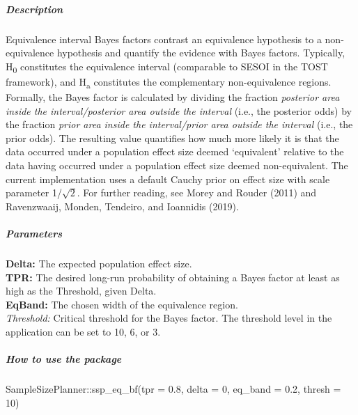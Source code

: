 \documentclass[
  english,
  man,floatsintext]{apa6}
\newenvironment{Shaded}{\begin{snugshade}}{\end{snugshade}}
\newcommand{\AttributeTok}[1]{\textcolor[rgb]{0.77,0.63,0.00}{#1}}
\newcommand{\DecValTok}[1]{\textcolor[rgb]{0.00,0.00,0.81}{#1}}
\newcommand{\FloatTok}[1]{\textcolor[rgb]{0.00,0.00,0.81}{#1}}
\newcommand{\FunctionTok}[1]{\textcolor[rgb]{0.00,0.00,0.00}{#1}}
\newcommand{\NormalTok}[1]{#1}
\newcommand{\SpecialCharTok}[1]{\textcolor[rgb]{0.00,0.00,0.00}{#1}}
\let\oldsubparagraph\subparagraph
\renewcommand{\subparagraph}[1]{\oldsubparagraph{#1}\mbox{}}
\begin{document}
\hypertarget{description-1}{%
\subparagraph{Description}\label{description-1}}

Equivalence interval Bayes factors contrast an equivalence hypothesis to a non-equivalence hypothesis and quantify the evidence with Bayes factors. Typically, H\textsubscript{0} constitutes the equivalence interval (comparable to SESOI in the TOST framework), and H\textsubscript{a} constitutes the complementary non-equivalence regions. Formally, the Bayes factor is calculated by dividing the fraction \emph{posterior area inside the interval/posterior area outside the interval} (i.e., the posterior odds) by the fraction \emph{prior area inside the interval/prior area outside the interval} (i.e., the prior odds). The resulting value quantifies how much more likely it is that the data occurred under a population effect size deemed `equivalent' relative to the data having occurred under a population effect size deemed non-equivalent. The current implementation uses a default Cauchy prior on effect size with scale parameter 1/\(\sqrt{2}\). For further reading, see Morey and Rouder (2011) and Ravenzwaaij, Monden, Tendeiro, and Ioannidis (2019).

\hypertarget{parameters-1}{%
\subparagraph{Parameters}\label{parameters-1}}

\textbf{Delta:} The expected population effect size.\\
\textbf{TPR:} The desired long-run probability of obtaining a Bayes factor at least as high as the Threshold, given Delta.\\
\textbf{EqBand:} The chosen width of the equivalence region.\\
\emph{Threshold:} Critical threshold for the Bayes factor. The threshold level in the application can be set to 10, 6, or 3.\\

\hypertarget{how-to-use-the-package-1}{%
\subparagraph{How to use the package}\label{how-to-use-the-package-1}}

\begin{Shaded}
\begin{Highlighting}[]
\NormalTok{SampleSizePlanner}\SpecialCharTok{::}\FunctionTok{ssp\_eq\_bf}\NormalTok{(}\AttributeTok{tpr =} \FloatTok{0.8}\NormalTok{, }\AttributeTok{delta =} \DecValTok{0}\NormalTok{, }\AttributeTok{eq\_band =} \FloatTok{0.2}\NormalTok{, }
    \AttributeTok{thresh =} \DecValTok{10}\NormalTok{)}
\end{Highlighting}
\end{Shaded}
\end{document}
